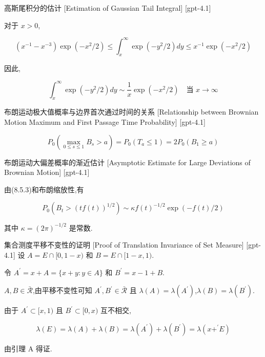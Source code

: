 \documentclass[UTF8]{ctexart}
\begin{document}
    
    
    \begin{lma}
        {高斯尾积分的估计}
        [Estimation of Gaussian Tail Integral]
        [gpt-4.1]
        
对于 $x > 0$,

\[
(x^{-1} - x^{-3}) \exp(-x^2/2) \leq \int_x^\infty \exp(-y^2/2) dy \leq x^{-1} \exp(-x^2/2)
\]

因此,

\[
\int_x^\infty \exp(-y^2/2) dy \sim \frac{1}{x} \exp(-x^2/2) \quad \text{当 } x \to \infty
\]

    \end{lma}
    
    
    
    \begin{ppt}
        {布朗运动极大值概率与边界首次通过时间的关系}
        [Relationship between Brownian Motion Maximum and First Passage Time Probability]
        [gpt-4.1]
        
\[
P_0 \left( \max_{0 \leq s \leq 1} B_s > a \right) = P_0(T_a \leq 1) = 2 P_0(B_1 \geq a)
\]

    \end{ppt}
    
    
    
    \begin{ppt}
        {布朗运动大偏差概率的渐近估计}
        [Asymptotic Estimate for Large Deviations of Brownian Motion]
        [gpt-4.1]
        
由(8.5.3)和布朗缩放性,有

\[
P_0\left(B_t > (t f(t))^{1/2}\right) \sim \kappa f(t)^{-1/2} \exp(-f(t)/2)
\]

其中 $\kappa = (2\pi)^{-1/2}$ 是常数.

    \end{ppt}
    
    
    
    \begin{prf}
        {集合测度平移不变性的证明}
        [Proof of Translation Invariance of Set Measure]
        [gpt-4.1]
        设 $A = E \cap [ 0 , 1 - x )$ 和 $B = E \cap [ 1 - x , 1 )$.

令 $A ^ { \prime } = x + A = \{ x + y : y \in A \}$ 和 $B ^ { \prime } = x - 1 + B$.

$A, B \in \bar { \mathcal { R } }$,由平移不变性可知 $A ^ { \prime }, B ^ { \prime } \in \bar { \mathcal { R } }$ 且 $\lambda ( A ) = \lambda ( A ^ { \prime } )$,$\lambda ( B ) = \lambda ( B ^ { \prime } )$.

由于 $A ^ { \prime } \subset [ x , 1 )$ 且 $B ^ { \prime } \subset [ 0 , x )$ 互不相交,

\[
\lambda ( E ) = \lambda ( A ) + \lambda ( B ) = \lambda ( A ^ { \prime } ) + \lambda ( B ^ { \prime } ) = \lambda ( x + ^ { \prime } E )

\]

由引理 A 得证.

    \end{prf}
    
\end{document}
